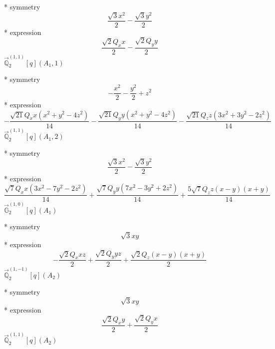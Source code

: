\documentclass[fleqn,8pt]{jsarticle}
\begin{document}
\noindent\quad ** symmetry
\begin{dmath*}
\frac{\sqrt{3} x^{2}}{2} - \frac{\sqrt{3} y^{2}}{2}
\end{dmath*}
\noindent\quad ** expression
\begin{dmath*}
\frac{\sqrt{2} Q_{x} x}{2} - \frac{\sqrt{2} Q_{y} y}{2}
\end{dmath*}
\noindent\quad $\vec{\mathbb{Q}}_{2}^{(1,1)}[q](A_{1},1)$

\noindent\quad ** symmetry
\begin{dmath*}
- \frac{x^{2}}{2} - \frac{y^{2}}{2} + z^{2}
\end{dmath*}
\noindent\quad ** expression
\begin{dmath*}
- \frac{\sqrt{21} Q_{x} x \left(x^{2} + y^{2} - 4 z^{2}\right)}{14} - \frac{\sqrt{21} Q_{y} y \left(x^{2} + y^{2} - 4 z^{2}\right)}{14} - \frac{\sqrt{21} Q_{z} z \left(3 x^{2} + 3 y^{2} - 2 z^{2}\right)}{14}
\end{dmath*}
\noindent\quad $\vec{\mathbb{Q}}_{2}^{(1,1)}[q](A_{1},2)$

\noindent\quad ** symmetry
\begin{dmath*}
\frac{\sqrt{3} x^{2}}{2} - \frac{\sqrt{3} y^{2}}{2}
\end{dmath*}
\noindent\quad ** expression
\begin{dmath*}
\frac{\sqrt{7} Q_{x} x \left(3 x^{2} - 7 y^{2} - 2 z^{2}\right)}{14} + \frac{\sqrt{7} Q_{y} y \left(7 x^{2} - 3 y^{2} + 2 z^{2}\right)}{14} + \frac{5 \sqrt{7} Q_{z} z \left(x - y\right) \left(x + y\right)}{14}
\end{dmath*}
\noindent\quad $\vec{\mathbb{G}}_{2}^{(1,0)}[q](A_{1})$

\noindent\quad ** symmetry
\begin{dmath*}
\sqrt{3} x y
\end{dmath*}
\noindent\quad ** expression
\begin{dmath*}
- \frac{\sqrt{2} Q_{x} x z}{2} + \frac{\sqrt{2} Q_{y} y z}{2} + \frac{\sqrt{2} Q_{z} \left(x - y\right) \left(x + y\right)}{2}
\end{dmath*}
\noindent\quad $\vec{\mathbb{Q}}_{2}^{(1,-1)}[q](A_{2})$

\noindent\quad ** symmetry
\begin{dmath*}
\sqrt{3} x y
\end{dmath*}
\noindent\quad ** expression
\begin{dmath*}
\frac{\sqrt{2} Q_{x} y}{2} + \frac{\sqrt{2} Q_{y} x}{2}
\end{dmath*}
\noindent\quad $\vec{\mathbb{Q}}_{2}^{(1,1)}[q](A_{2})$
\end{document}
